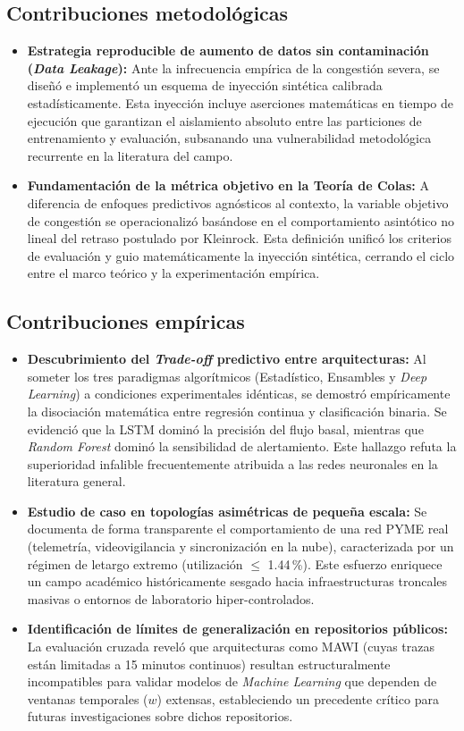 \documentclass[12pt]{report}
\begin{document}
\subsection*{Contribuciones metodológicas}

\begin{itemize}
    \item \textbf{Estrategia reproducible de aumento de datos sin contaminación (\textit{Data Leakage}):} Ante la infrecuencia empírica de la congestión severa, se diseñó e implementó un esquema de inyección sintética calibrada estadísticamente. Esta inyección incluye aserciones matemáticas en tiempo de ejecución que garantizan el aislamiento absoluto entre las particiones de entrenamiento y evaluación, subsanando una vulnerabilidad metodológica recurrente en la literatura del campo.
    \item \textbf{Fundamentación de la métrica objetivo en la Teoría de Colas:} A diferencia de enfoques predictivos agnósticos al contexto, la variable objetivo de congestión se operacionalizó basándose en el comportamiento asintótico no lineal del retraso postulado por Kleinrock. Esta definición unificó los criterios de evaluación y guio matemáticamente la inyección sintética, cerrando el ciclo entre el marco teórico y la experimentación empírica.
\end{itemize}

\subsection*{Contribuciones empíricas}

\begin{itemize}
    \item \textbf{Descubrimiento del \textit{Trade-off} predictivo entre arquitecturas:} Al someter los tres paradigmas algorítmicos (Estadístico, Ensambles y \textit{Deep Learning}) a condiciones experimentales idénticas, se demostró empíricamente la disociación matemática entre regresión continua y clasificación binaria. Se evidenció que la LSTM dominó la precisión del flujo basal, mientras que \textit{Random Forest} dominó la sensibilidad de alertamiento. Este hallazgo refuta la superioridad infalible frecuentemente atribuida a las redes neuronales en la literatura general.
    \item \textbf{Estudio de caso en topologías asimétricas de pequeña escala:} Se documenta de forma transparente el comportamiento de una red PYME real (telemetría, videovigilancia y sincronización en la nube), caracterizada por un régimen de letargo extremo (utilización $\leq$ 1.44\,\%). Este esfuerzo enriquece un campo académico históricamente sesgado hacia infraestructuras troncales masivas o entornos de laboratorio hiper-controlados.
    \item \textbf{Identificación de límites de generalización en repositorios públicos:} La evaluación cruzada reveló que arquitecturas como MAWI (cuyas trazas están limitadas a 15 minutos continuos) resultan estructuralmente incompatibles para validar modelos de \textit{Machine Learning} que dependen de ventanas temporales ($w$) extensas, estableciendo un precedente crítico para futuras investigaciones sobre dichos repositorios.
\end{itemize}
\end{document}
